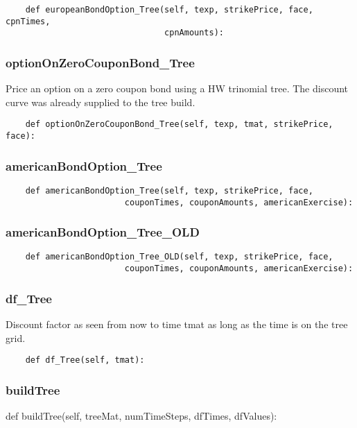 \documentclass[twoside,11pt]{book}
\begin{document}
\begin{lstlisting}
    def europeanBondOption_Tree(self, texp, strikePrice, face, cpnTimes,
                                cpnAmounts):
\end{lstlisting}

\subsubsection*{{\bf optionOnZeroCouponBond\_Tree}}
Price an option on a zero coupon bond using a HW trinomial tree. The discount curve was already supplied to the tree build.  

\begin{lstlisting}
    def optionOnZeroCouponBond_Tree(self, texp, tmat, strikePrice, face):
\end{lstlisting}

\subsubsection*{{\bf americanBondOption\_Tree}}


\begin{lstlisting}
    def americanBondOption_Tree(self, texp, strikePrice, face,
                        couponTimes, couponAmounts, americanExercise):
\end{lstlisting}

\subsubsection*{{\bf americanBondOption\_Tree\_OLD}}


\begin{lstlisting}
    def americanBondOption_Tree_OLD(self, texp, strikePrice, face,
                        couponTimes, couponAmounts, americanExercise):
\end{lstlisting}

\subsubsection*{{\bf df\_Tree}}
Discount factor as seen from now to time tmat as long as the time is on the tree grid.  

\begin{lstlisting}
    def df_Tree(self, tmat):
\end{lstlisting}

\subsubsection*{{\bf buildTree}}
def buildTree(self, treeMat, numTimeSteps, dfTimes, dfValues): 
\end{document}
